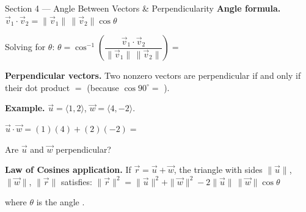 \documentclass[10pt]{article}
\begin{document}
\begin{notesbox}{Section 4 --- Angle Between Vectors \& Perpendicularity}
\small
\textbf{Angle formula.}
$\vec{v}_1 \cdot \vec{v}_2 = \|\vec{v}_1\|\,\|\vec{v}_2\| \cos\theta$

\vspace{0.08in}
Solving for $\theta$:
\quad $\theta = \cos^{-1}\!\left( \dfrac{\vec{v}_1 \cdot \vec{v}_2}{\|\vec{v}_1\|\,\|\vec{v}_2\|} \right)
= $ 

\vspace{0.12in}
\textbf{Perpendicular vectors.} Two nonzero vectors are perpendicular if and only if their
dot product $= $  \quad (because $\cos 90^\circ = $ ).

\vspace{0.12in}
\textbf{Example.} $\vec{u}=\langle 1,2\rangle$, $\vec{w}=\langle 4,-2\rangle$.

\vspace{0.06in}
\hspace{1em} $\vec{u}\cdot\vec{w} = (1)(4) + (2)(-2) = $ 

\hspace{1em} Are $\vec{u}$ and $\vec{w}$ perpendicular? 

\vspace{0.1in}
\textbf{Law of Cosines application.} If $\vec{r} = \vec{u}+\vec{w}$, the triangle with sides
$\|\vec{u}\|$, $\|\vec{w}\|$, $\|\vec{r}\|$ satisfies:
$\|\vec{r}\|^2 = \|\vec{u}\|^2 + \|\vec{w}\|^2 - 2\|\vec{u}\|\,\|\vec{w}\|\cos\theta$

where $\theta$ is the angle .
\end{notesbox}
\end{document}

